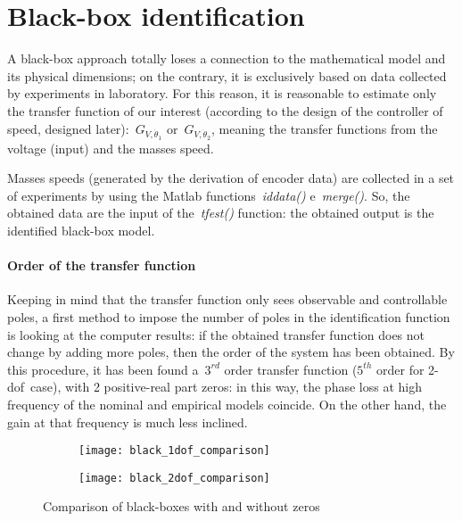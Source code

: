 \section{Black-box identification}

A black-box approach totally loses a connection to the mathematical model and its physical dimensions; on the contrary, it is exclusively based on data collected by experiments in laboratory.
For this reason, it is reasonable to estimate only the transfer function of our interest (according to the design of the controller of speed, designed later):~$G_{V,\dot{\theta}_1}$ or~$G_{V,\dot{\theta}_2}$, meaning the transfer functions from the voltage (input) and the masses speed.

Masses speeds (generated by the derivation of encoder data) are collected in a set of experiments by using the Matlab functions~\textit{iddata()} e~\textit{merge()}. So, the obtained data are the input of the~\textit{tfest()} function: the obtained output is the identified black-box model.

\paragraph{Order of the transfer function}

Keeping in mind that the transfer function only sees observable and controllable poles, a first method to impose the number of poles in the identification function is looking at the computer results: if the obtained transfer function does not change by adding more poles, then the order of the system has been obtained.
By this procedure, it has been found a~$3^{rd}$ order transfer function ($5^{th}$ order for \acrshort{2-dof}\ case), with 2 positive-real part zeros: in this way, the phase loss at high frequency of the nominal and empirical models coincide. On the other hand, the gain at that frequency is much less inclined.
\begin{figure}[h]
	\centering
	\begin{subfigure}{0.45\columnwidth}
		\texttt{[image: black\_1dof\_comparison]}
	\end{subfigure}
	\begin{subfigure}{0.45\columnwidth}
		\texttt{[image: black\_2dof\_comparison]}
	\end{subfigure}
	\caption{Comparison of black-boxes with and without zeros}
	\label{fig:black_comparison}
\end{figure}

